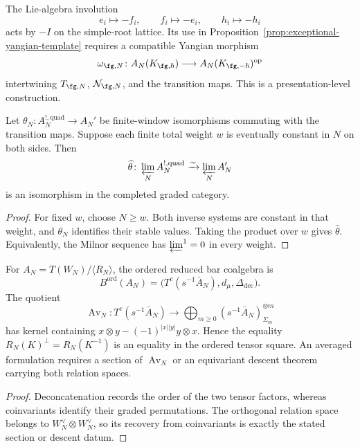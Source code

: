 \begin{remark}
\label{rem:exceptional-chevalley-intrinsic}
The Lie-algebra involution
\[
e_i\longmapsto-f_i,\qquad f_i\longmapsto-e_i,
\qquad h_i\longmapsto-h_i
\]
acts by $-I$ on the simple-root lattice.  Its use in
Proposition~\ref{prop:exceptional-yangian-template} requires a compatible
Yangian morphism
\[
\omega_{\fg,N}\colon
A_N(K_{\fg,\hbar})\longrightarrow
A_N(K_{\fg,-\hbar})^{\mathrm{op}}
\]
intertwining $T_{\fg,N}$, $\mathcal N_{\fg,N}$, and the transition maps.
This is a presentation-level construction.
\end{remark}

\begin{lemma}
\label{lem:exceptional-finite-window-promotion}
Let $\theta_N\colon A_N^{!,\mathrm{quad}}\to A_N'$ be finite-window
isomorphisms commuting with the transition maps.  Suppose each finite
total weight $w$ is eventually constant in $N$ on both sides.  Then
\[
\widehat\theta\colon
\varprojlim_N A_N^{!,\mathrm{quad}}
\xrightarrow{\sim}\varprojlim_N A_N'
\]
is an isomorphism in the completed graded category.
\end{lemma}

\begin{proof}
For fixed $w$, choose $N\ge w$.  Both inverse systems are constant in
that weight, and $\theta_N$ identifies their stable values.  Taking the
product over $w$ gives $\widehat\theta$.  Equivalently, the Milnor
sequence has $\varprojlim^{1}=0$ in every weight.
\end{proof}

\begin{proposition}
\label{prop:exceptional-yangian-ordered-bar-averaging}
For $A_N=T(W_N)/\langle R_N\rangle$, the ordered reduced bar coalgebra is
\[
B^{\mathrm{ord}}(A_N)=
\bigl(T^c(s^{-1}\bar A_N),d_\mu,\Delta_{\mathrm{dec}}\bigr).
\]
The quotient
\[
\operatorname{Av}_N\colon
T^c(s^{-1}\bar A_N)\longrightarrow
\bigoplus_{m\ge0}(s^{-1}\bar A_N)^{\otimes m}_{\Sigma_m}
\]
has kernel containing
$x\otimes y-(-1)^{|x||y|}y\otimes x$.  Hence the equality
$R_N(K)^\perp=R_N(K^{-1})$ is an equality in the ordered tensor square.
An averaged formulation requires a section of $\operatorname{Av}_N$ or
an equivariant descent theorem carrying both relation spaces.
\end{proposition}

\begin{proof}
Deconcatenation records the order of the two tensor factors, whereas
coinvariants identify their graded permutations.  The orthogonal
relation space belongs to $W_N^\vee\otimes W_N^\vee$, so its recovery
from coinvariants is exactly the stated section or descent datum.
\end{proof}

